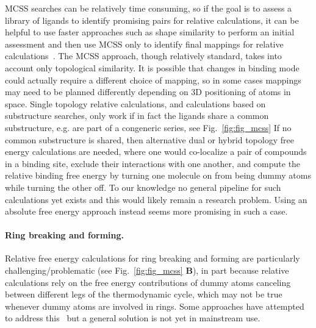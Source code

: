 \documentclass[9pt,bestpractices]{livecoms}
\begin{document}
%
MCSS searches can be relatively time consuming, so if the goal is to assess a library of ligands to identify promising pairs for relative calculations, it can be helpful to use faster approaches such as shape similarity to perform an initial assessment and then use MCSS only to identify final mappings for relative calculations~\cite{raymond2002maximum,klabunde2012mars,jones2009elucidating}.
%
The MCSS approach, though relatively standard, takes into account only topological similarity. It is possible that changes in binding mode could actually require a different choice of mapping, so in some cases mappings may need to be planned differently depending on 3D positioning of atoms in space.
%
Single topology relative calculations, and calculations based on substructure searches, only work if in fact the ligands share a common substructure, e.g. are part of a congeneric series, see Fig.~\ref{fig:fig_mcss}
If no common substructure is shared, then alternative dual or hybrid topology free energy calculations are needed, where one would co-localize a pair of compounds in a binding site, exclude their interactions with one another, and compute the relative binding free energy by turning one molecule on from being dummy atoms while turning the other off.
To our knowledge no general pipeline for such calculations yet exists and this would likely remain a research problem. Using an absolute free energy approach  instead seems more promising in such a case. 
%
\paragraph{Ring breaking and forming.} Relative free energy calculations for ring breaking and forming are particularly challenging/problematic (see Fig.~\ref{fig:fig_mcss} \textbf{B}), in part because relative calculations rely on the free energy contributions of dummy atoms canceling between different legs of the thermodynamic cycle, which may not be true whenever dummy atoms are involved in rings.
Some approaches have attempted to address this~\cite{clark2019relative} but a general solution is not yet in mainstream use.
%
\end{document}
